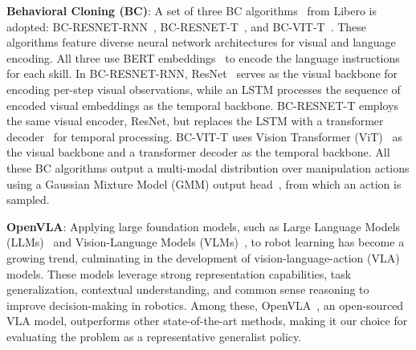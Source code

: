 \textbf{Behavioral Cloning (BC)}: A set of three BC algorithms~\cite{torabi2018behavioral} from Libero is adopted: BC-RESNET-RNN~\cite{mandlekar2021matters}, BC-RESNET-T~\cite{zhu2023viola}, and BC-VIT-T~\cite{kim2021vilt}. These algorithms feature diverse neural network architectures for visual and language encoding. All three use BERT embeddings~\cite{devlin2018bert} to encode the language instructions for each skill. In BC-RESNET-RNN, ResNet~\cite{he2016identity} serves as the visual backbone for encoding per-step visual observations, while an LSTM processes the sequence of encoded visual embeddings as the temporal backbone. BC-RESNET-T employs the same visual encoder, ResNet, but replaces the LSTM with a transformer decoder~\cite{vaswani2017attention} for temporal processing. BC-VIT-T uses Vision Transformer (ViT)~\cite{dosovitskiy2020image} as the visual backbone and a transformer decoder as the temporal backbone. All these BC algorithms output a multi-modal distribution over manipulation actions using a Gaussian Mixture Model (GMM) output head~\cite{bishop1994mixture}, from which an action is sampled.



\textbf{OpenVLA}:  Applying large foundation models, such as Large Language Models (LLMs)~\cite{openai2024chatgpt} and Vision-Language Models (VLMs)~\cite{dubey2024llama}, to robot learning has become a growing trend, culminating in the development of vision-language-action (VLA) models. These models leverage strong representation capabilities, task generalization, contextual understanding, and common sense reasoning to improve decision-making in robotics. Among these, OpenVLA~\cite{kim2024openvla}, an open-sourced VLA model, outperforms other state-of-the-art methods, making it our choice for evaluating the \pb problem as a representative generalist policy. 


